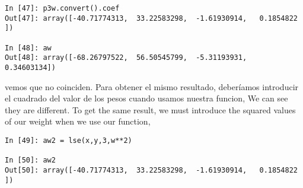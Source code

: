 \begin{verbatim}
In [47]: p3w.convert().coef
Out[47]: array([-40.71774313,  33.22583298,  -1.61930914,   0.1854822 ])
	
In [48]: aw
Out[48]: array([-68.26797522,  56.50545799,  -5.31193931,   0.34603134])
\end{verbatim}

\begin{paracol}{2}
vemos que no coinciden. Para obtener el mismo resultado, deberíamos introducir el cuadrado del valor de los pesos cuando usamos nuestra funcion,
\switchcolumn
We can see they are different. To get the same result, we must introduce the squared values of our weight when we use our function,

\end{paracol}
\begin{verbatim}
In [49]: aw2 = lse(x,y,3,w**2)

In [50]: aw2
Out[50]: array([-40.71774313,  33.22583298,  -1.61930914,   0.1854822 ])
\end{verbatim}

